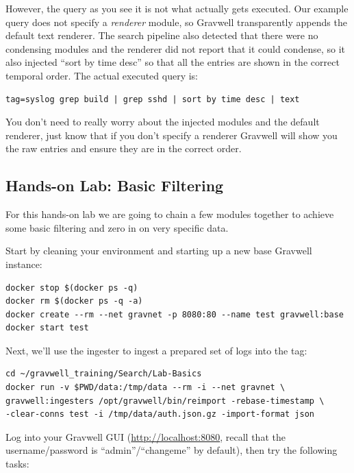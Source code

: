However, the query as you see it is not what actually gets executed.
Our example query does not specify a \emph{renderer} module, so Gravwell
transparently appends the default text renderer. The search pipeline
also detected that there were no condensing modules and the renderer did
not report that it could condense, so it also injected ``sort by time
desc'' so that all the entries are shown in the correct temporal order.
The actual executed query is:

\begin{Verbatim}[breaklines=true]
tag=syslog grep build | grep sshd | sort by time desc | text
\end{Verbatim}

You don't need to really worry about the injected modules and the
default renderer, just know that if you don't specify a renderer
Gravwell will show you the raw entries and ensure they are in the
correct order.


\subsection{Hands-on Lab: Basic Filtering}
\label{sec:lab-filter}

For this hands-on lab we are going to chain a few modules together to
achieve some basic filtering and zero in on very specific data.

Start by cleaning your environment and starting up a new base Gravwell
instance:

\begin{Verbatim}[breaklines=true]
docker stop $(docker ps -q)
docker rm $(docker ps -q -a)
docker create --rm --net gravnet -p 8080:80 --name test gravwell:base
docker start test
\end{Verbatim}

Next, we'll use the  ingester to ingest a prepared set of logs into the  tag:

\begin{Verbatim}[breaklines=true]
cd ~/gravwell_training/Search/Lab-Basics
docker run -v $PWD/data:/tmp/data --rm -i --net gravnet \
gravwell:ingesters /opt/gravwell/bin/reimport -rebase-timestamp \
-clear-conns test -i /tmp/data/auth.json.gz -import-format json
\end{Verbatim}

Log into your Gravwell GUI (\href{http://localhost:8080}{http://localhost:8080}, recall that the username/password is ``admin''/``changeme'' by default), then try the following tasks:

